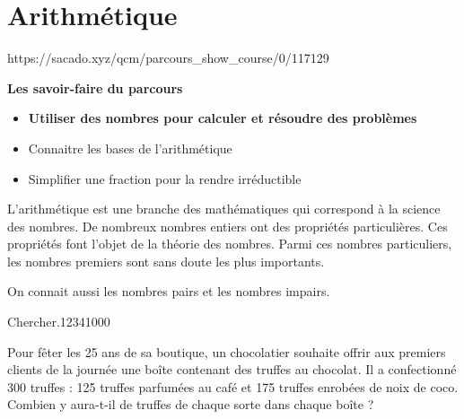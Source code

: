 \chapter{Arithmétique}
{https://sacado.xyz/qcm/parcours_show_course/0/117129}
{


 \begin{CpsCol}
\textbf{Les savoir-faire du parcours}
 \begin{itemize}
 \item \textbf{Utiliser des nombres pour calculer et résoudre des problèmes}
 \item Connaitre les bases de l'arithmétique
 \item Simplifier une fraction pour la rendre irréductible
 \end{itemize}
 \end{CpsCol}

\begin{His}

  
L'arithmétique est une branche des mathématiques qui correspond à la science des nombres. De nombreux nombres entiers ont des propriétés particulières. Ces propriétés font l'objet de la théorie des nombres. Parmi ces nombres particuliers, les nombres premiers sont sans doute les plus importants.

On connait aussi les nombres pairs et les nombres impairs. 

\end{His}

 

\begin{ExoDec}{Chercher.}{1234}{1}{0}{0}{0}

Pour fêter les 25 ans de sa boutique, un chocolatier souhaite offrir aux premiers clients de la journée une boîte contenant des truffes au chocolat.
Il a confectionné 300 truffes : 125 truffes parfumées au café et 175 truffes enrobées de noix de coco. Combien y aura-t-il de truffes de chaque sorte dans chaque boîte ?
 
\end{ExoDec}



}

